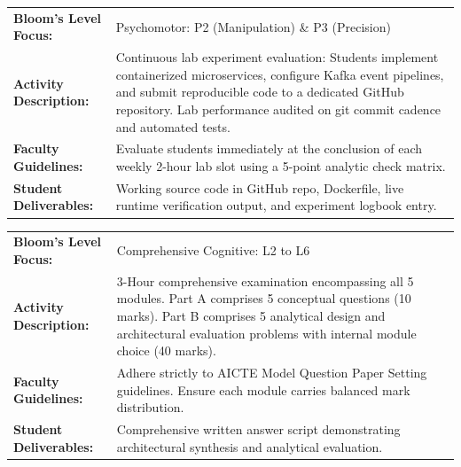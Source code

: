 \documentclass[10pt,a4paper]{article}
\begin{document}
\vspace{4pt}
\begin{table}[h!]
\centering
\small
\begin{tabularx}{\textwidth}{L{3.2cm} Y}
\toprule
{}
 \\
\midrule
\textbf{Bloom's Level Focus:} & Psychomotor: P2 (Manipulation) \& P3 (Precision) \\
\textbf{Activity Description:} & Continuous lab experiment evaluation: Students implement containerized microservices, configure Kafka event pipelines, and submit reproducible code to a dedicated GitHub repository. Lab performance audited on git commit cadence and automated tests. \\
\textbf{Faculty Guidelines:} & Evaluate students immediately at the conclusion of each weekly 2-hour lab slot using a 5-point analytic check matrix. \\
\textbf{Student Deliverables:} & Working source code in GitHub repo, Dockerfile, live runtime verification output, and experiment logbook entry. \\
\bottomrule
\end{tabularx}
\end{table}
\vspace{4pt}
\begin{table}[h!]
\centering
\small
\begin{tabularx}{\textwidth}{L{3.2cm} Y}
\toprule
{}
 \\
\midrule
\textbf{Bloom's Level Focus:} & Comprehensive Cognitive: L2 to L6 \\
\textbf{Activity Description:} & 3-Hour comprehensive examination encompassing all 5 modules. Part A comprises 5 conceptual questions (10 marks). Part B comprises 5 analytical design and architectural evaluation problems with internal module choice (40 marks). \\
\textbf{Faculty Guidelines:} & Adhere strictly to AICTE Model Question Paper Setting guidelines. Ensure each module carries balanced mark distribution. \\
\textbf{Student Deliverables:} & Comprehensive written answer script demonstrating architectural synthesis and analytical evaluation. \\
\bottomrule
\end{tabularx}
\end{table}
\end{document}
